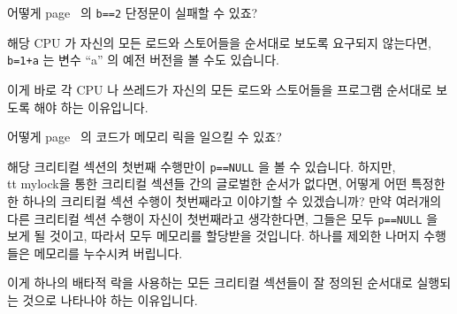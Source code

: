 \begin{enumerate}
\QuickQ{}
	어떻게 page~\pageref{codesample:advsync:What Can You Count On? 1} 의
	{\tt b==2} 단정문이 실패할 수 있죠?

\QuickA{}
	해당 CPU 가 자신의 모든 로드와 스토어들을 순서대로 보도록 요구되지
	않는다면, {\tt b=1+a} 는 변수 ``a'' 의 예전 버전을 볼 수도 있습니다.

	이게 바로 각 CPU 나 쓰레드가 자신의 모든 로드와 스토어들을 프로그램
	순서대로 보도록 해야 하는 이유입니다.

\QuickQ{}
	어떻게 page~\pageref{codesample:advsync:What Can You Count On? 2} 의
	코드가 메모리 릭을 일으킬 수 있죠?

\QuickA{}
	해당 크리티컬 섹션의 첫번째 수행만이 {\tt p==NULL} 을 볼 수 있습니다.
	하지만, {\\tt mylock}을 통한 크리티컬 섹션들 간의 글로벌한 순서가
	없다면, 어떻게 어떤 특정한 한 하나의 크리티컬 섹션 수행이 첫번째라고
	이야기할 수 있겠습니까?
	만약 여러개의 다른 크리티컬 섹션 수행이 자신이 첫번째라고 생각한다면,
	그들은 모두 {\tt p==NULL} 을 보게 될 것이고, 따라서 모두 메모리를
	할당받을 것입니다.
	하나를 제외한 나머지 수행들은 메모리를 누수시켜 버립니다.

	이게 하나의 배타적 락을 사용하는 모든 크리티컬 섹션들이 잘 정의된
	순서대로 실행되는 것으로 나타나야 하는 이유입니다.

\end{enumerate}
